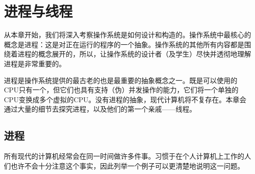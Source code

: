 \chapter{进程与线程}
从本章开始，我们将深入考察操作系统是如何设计和构造的。操作系统中最核心的概念是进程：这是对正在运行的程序的一个抽象。操作系统的其他所有内容都是围绕着进程的概念展开的，所以，让操作系统的设计者（及学生）尽快并透彻地理解进程是非常重要的。
\par 进程是操作系统提供的最古老的也是最重要的抽象概念之一。既是可以使用的CPU只有一个，但它们也具有支持（伪）并发操作的能力，它们将一个单独的CPU变换成多个虚拟的CPU。没有进程的抽象，现代计算机将不复存在。本章会通过大量的细节去探究进程，以及他们的第一个亲戚——线程。

\section{进程}
所有现代的计算机经常会在同一时间做许多件事。习惯于在个人计算机上工作的人们也许不会十分注意这个事实，因此列举一个例子可以更清楚地说明这一问题。